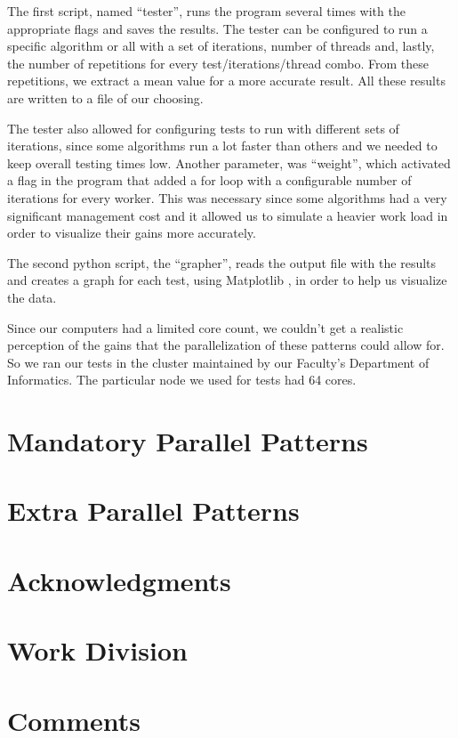 \documentclass[9pt,journal]{IEEEtran}
\begin{document}
The first script, named “tester”, runs the program several times with the appropriate flags and saves the results. The tester can be configured to run a specific algorithm or all with a set of iterations, number of threads and, lastly, the number of repetitions for every test/iterations/thread combo. From these repetitions, we extract a mean value for a more accurate result. All these results are written to a file of our choosing.

The tester also allowed for configuring tests to run with different sets of iterations, since some algorithms run a lot faster than others and we needed to keep overall testing times low.  Another parameter, was “weight”, which activated a flag in the program that added a for loop with a configurable number of iterations for every worker. This was necessary since some algorithms had a very significant management cost and it allowed us to simulate a heavier work load in order to visualize their gains more accurately.

The second python script, the “grapher”, reads the output file with the results and creates a graph for each test, using Matplotlib \cite{matplotlib}, in order to help us visualize the data. 

Since our computers had a limited core count, we couldn’t get a realistic perception of the gains that the parallelization of these patterns could allow for. So we ran our tests in the cluster maintained by our Faculty’s Department of Informatics. The particular node we used for tests had 64 cores.

\section{Mandatory Parallel Patterns}

\section{Extra Parallel Patterns}

\section{Acknowledgments}


{}

\section{Work Division}

\section{Comments}


\end{document}
